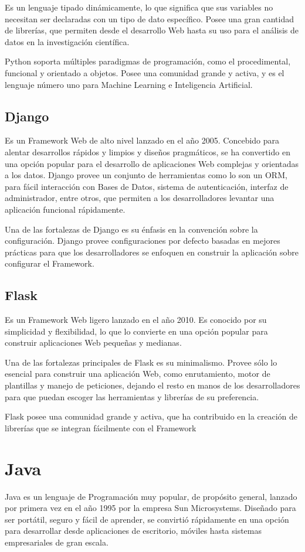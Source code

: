         Es un lenguaje tipado dinámicamente, lo que significa que sus variables no necesitan ser declaradas con un tipo de dato específico. Posee una gran cantidad de librerías, que permiten desde el desarrollo Web hasta su uso para el análisis de datos en la investigación científica.

        Python soporta múltiples paradigmas de programación, como el procedimental, funcional y  orientado a objetos. Posee una comunidad grande y activa, y es el lenguaje número uno para Machine Learning e Inteligencia Artificial. \cite{downey2015think}
        \subsection{Django}
            Es un Framework Web de alto nivel lanzado en el año 2005. Concebido para alentar desarrollos rápidos y limpios y diseños pragmáticos, se ha convertido en una opción popular para el desarrollo de aplicaciones Web complejas y orientadas a los datos. Django provee un conjunto de herramientas como lo son un ORM, para fácil interacción con Bases de Datos, sistema de autenticación, interfaz de administrador, entre otros, que permiten a los desarrolladores levantar una aplicación funcional rápidamente.

            Una de las fortalezas de Django es su énfasis en la convención sobre la configuración. Django provee configuraciones por defecto basadas en mejores prácticas para que los desarrolladores se enfoquen en construir la aplicación sobre configurar el Framework. \cite{django}
        \subsection{Flask}
            Es un Framework Web ligero lanzado en el año 2010. Es conocido por su simplicidad y flexibilidad, lo que lo convierte en una opción popular para construir aplicaciones Web pequeñas y medianas.

            Una de las fortalezas principales de Flask es su minimalismo. Provee sólo lo esencial para construir una aplicación Web, como enrutamiento, motor de plantillas y manejo de peticiones, dejando el resto en manos de los desarrolladores para que puedan escoger las herramientas y librerías de su preferencia. 

            Flask posee una comunidad grande y activa, que ha contribuido en la creación de librerías que se integran fácilmente con el Framework \cite{flask}
    \section{Java}
        Java es un lenguaje de Programación muy popular, de propósito general, lanzado por primera vez en el año 1995 por la empresa Sun Microsystems. Diseñado para ser portátil, seguro y fácil de aprender, se convirtió rápidamente en una opción para desarrollar desde aplicaciones de escritorio, móviles hasta sistemas empresariales de gran escala. 

